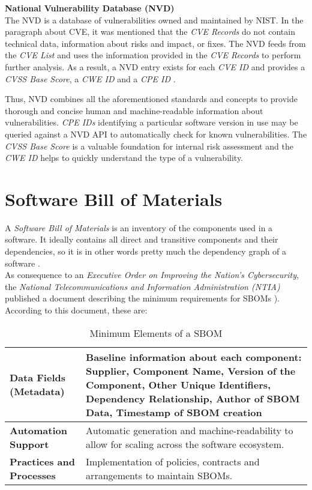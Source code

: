 \noindent
\textbf{National Vulnerability Database (NVD)}\\
\noindent
The NVD is a database of vulnerabilities owned and maintained by NIST. In the paragraph about CVE, it was mentioned that the \textit{CVE Records} do not contain technical data, information about risks and impact, or fixes. The NVD feeds from the \textit{CVE List} and uses the information provided in the \textit{CVE Records} to perform further analysis. As a result, a NVD entry exists for each \textit{CVE ID} and provides a \textit{CVSS Base Score}, a \textit{CWE ID} and a \textit{CPE ID} \cite{NVDWebsite}.\par 
Thus, NVD combines all the aforementioned standards and concepts to provide thorough and concise human and machine-readable information about vulnerabilities. \textit{CPE IDs} identifying a particular software version in use may be queried against a NVD API to automatically check for known vulnerabilities. The \textit{CVSS Base Score} is a valuable foundation for internal risk assessment and the \textit{CWE ID} helps to quickly understand the type of a vulnerability.\\

\section{Software Bill of Materials} \label{sec:SBOM}
A \textit{Software Bill of Materials} is an inventory of the components used in a software. It ideally contains all direct and transitive components and their dependencies, so it is in other words pretty much the dependency graph of a software \cite{OWASPWebsite,NTIASBOM}.\\

As consequence to an \textit{Executive Order on Improving the Nation's Cybersecurity}, the \textit{National Telecommunications and Information Administration (NTIA)} published a document describing the minimum requirements for SBOMs \cite{ExecutiveOrderSBOM,NTIASBOM}). According to this document, these are:

\begin{table}[H]
	\begin{tabularx}{\linewidth}{|l|X|}
		\hline
		\textbf{Data Fields (Metadata)} & Baseline information about each component: Supplier, Component Name, Version of the Component, Other Unique Identifiers, Dependency Relationship, Author of SBOM Data, Timestamp of SBOM creation \\
		\hline
		\textbf{Automation Support} & Automatic generation and machine-readability to allow for scaling across the software ecosystem. \\
		\hline
		\textbf{Practices and Processes} & Implementation of policies, contracts and arrangements to maintain SBOMs.\\
		\hline
	\end{tabularx}
	\caption[Minimum Elements of a SBOM]{Minimum Elements of a SBOM }
	\label{Tab:ElementsOfSBOM}
\end{table}


